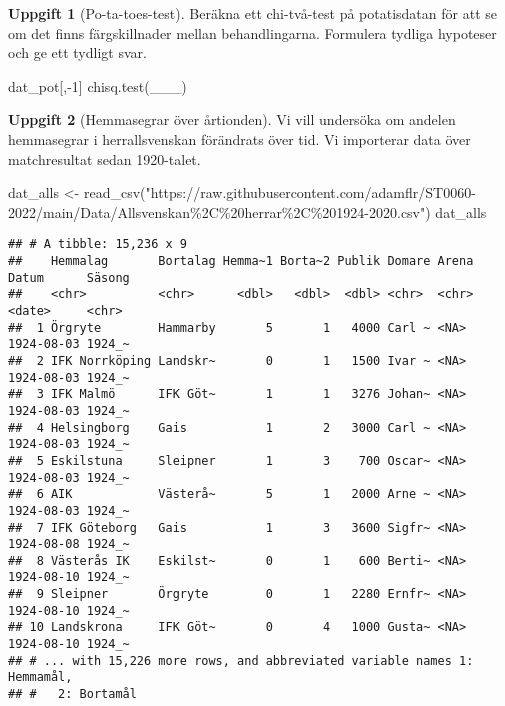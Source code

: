 \documentclass[
]{book}
\newenvironment{Shaded}{\begin{snugshade}}{\end{snugshade}}
\newcommand{\DecValTok}[1]{\textcolor[rgb]{0.00,0.00,0.81}{#1}}
\newcommand{\FunctionTok}[1]{\textcolor[rgb]{0.00,0.00,0.00}{#1}}
\newcommand{\NormalTok}[1]{#1}
\newcommand{\OtherTok}[1]{\textcolor[rgb]{0.56,0.35,0.01}{#1}}
\newcommand{\SpecialCharTok}[1]{\textcolor[rgb]{0.00,0.00,0.00}{#1}}
\newcommand{\StringTok}[1]{\textcolor[rgb]{0.31,0.60,0.02}{#1}}
\theoremstyle{definition}
\theoremstyle{definition}
\theoremstyle{definition}
\newtheorem{exercise}{Uppgift}[chapter]
\theoremstyle{definition}
\theoremstyle{remark}
\begin{document}
\begin{exercise}[Po-ta-toes-test]

Beräkna ett chi-två-test på potatisdatan för att se om det finns färgskillnader mellan behandlingarna. Formulera tydliga hypoteser och ge ett tydligt svar.

\begin{Shaded}
\begin{Highlighting}[]
\NormalTok{dat\_pot[,}\SpecialCharTok{{-}}\DecValTok{1}\NormalTok{]}
\FunctionTok{chisq.test}\NormalTok{(\_\_\_)}
\end{Highlighting}
\end{Shaded}

\end{exercise}

\begin{exercise}[Hemmasegrar över årtionden]

Vi vill undersöka om andelen hemmasegrar i herrallsvenskan förändrats över tid. Vi importerar data över matchresultat sedan 1920-talet.

\begin{Shaded}
\begin{Highlighting}[]
\NormalTok{dat\_alls }\OtherTok{\textless{}{-}} \FunctionTok{read\_csv}\NormalTok{(}\StringTok{"https://raw.githubusercontent.com/adamflr/ST0060{-}2022/main/Data/Allsvenskan\%2C\%20herrar\%2C\%201924{-}2020.csv"}\NormalTok{)}
\NormalTok{dat\_alls}
\end{Highlighting}
\end{Shaded}

\begin{verbatim}
## # A tibble: 15,236 x 9
##    Hemmalag       Bortalag Hemma~1 Borta~2 Publik Domare Arena Datum      Säsong
##    <chr>          <chr>      <dbl>   <dbl>  <dbl> <chr>  <chr> <date>     <chr> 
##  1 Örgryte        Hammarby       5       1   4000 Carl ~ <NA>  1924-08-03 1924_~
##  2 IFK Norrköping Landskr~       0       1   1500 Ivar ~ <NA>  1924-08-03 1924_~
##  3 IFK Malmö      IFK Göt~       1       1   3276 Johan~ <NA>  1924-08-03 1924_~
##  4 Helsingborg    Gais           1       2   3000 Carl ~ <NA>  1924-08-03 1924_~
##  5 Eskilstuna     Sleipner       1       3    700 Oscar~ <NA>  1924-08-03 1924_~
##  6 AIK            Västerå~       5       1   2000 Arne ~ <NA>  1924-08-03 1924_~
##  7 IFK Göteborg   Gais           1       3   3600 Sigfr~ <NA>  1924-08-08 1924_~
##  8 Västerås IK    Eskilst~       0       1    600 Berti~ <NA>  1924-08-10 1924_~
##  9 Sleipner       Örgryte        0       1   2280 Ernfr~ <NA>  1924-08-10 1924_~
## 10 Landskrona     IFK Göt~       0       4   1000 Gusta~ <NA>  1924-08-10 1924_~
## # ... with 15,226 more rows, and abbreviated variable names 1: Hemmamål,
## #   2: Bortamål
\end{verbatim}


\end{exercise}
\end{document}
